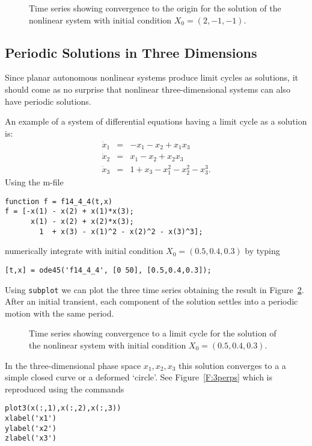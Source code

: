 \documentclass{ximera}
\begin{document}
\begin{figure}[htb]
   \centerline{%
   }
   \caption{Time series showing convergence to the origin for the solution of 
	the nonlinear system \protect{} with initial condition 
	$X_0=(2,-1,-1)$.}
   \label{F:fnonlin3}
\end{figure}
 
\subsection*{Periodic Solutions in Three Dimensions}

Since planar autonomous nonlinear systems produce limit cycles as solutions, 
it should come as no surprise that nonlinear three-dimensional systems can 
also have periodic solutions.  

An example of a system of differential equations having a limit cycle as a 
solution is:
\begin{equation*} \label{E:3per}
\begin{array}{rcl}
\dot{x}_1 & = & -x_1 - x_2 + x_1x_3 \\
\dot{x}_2 & = &  x_1 - x_2 + x_2x_3 \\
\dot{x}_3 & = &  1 + x_3 - x_1^2 - x_2^2 - x_3^3.
\end{array}
\end{equation*}
Using the m-file
\begin{verbatim}
function f = f14_4_4(t,x)
f = [-x(1) - x(2) + x(1)*x(3); 
      x(1) - x(2) + x(2)*x(3); 
        1  + x(3) - x(1)^2 - x(2)^2 - x(3)^3];
\end{verbatim}
numerically integrate  with initial condition
$X_0=(0.5,0.4,0.3)$ by typing
\begin{verbatim}
[t,x] = ode45('f14_4_4', [0 50], [0.5,0.4,0.3]);
\end{verbatim}
Using {\tt subplot} we can plot the three time series obtaining the result in 
Figure~\ref{F:3per}.  After an initial transient, each component of the 
solution settles into a periodic motion with the same period.
\begin{figure}[htb]
   \centerline{%
   }
   \caption{Time series showing convergence to a limit cycle for the solution 
	of the nonlinear system \protect{} with initial condition 
	$X_0=(0.5,0.4,0.3)$.}
   \label{F:3per}
\end{figure}

In the three-dimensional phase space $x_1,x_2,x_3$ this solution converges to a 
a simple closed curve or a deformed `circle'.  See Figure~\ref{F:3perps} 
which is reproduced using the \Matlab commands
\begin{verbatim}
plot3(x(:,1),x(:,2),x(:,3))                  
xlabel('x1')
ylabel('x2')
zlabel('x3')
\end{verbatim}
\end{document}
